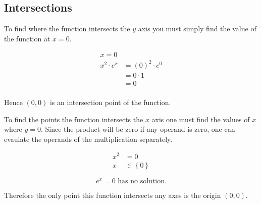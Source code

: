 \subsection{Intersections}

To find where the function intersects the $y$ axis you must simply
find the value of the function at \(x = 0\).

\[
    \begin{aligned}
        x = 0 & \\
        x^2\cdot e^x & = (0)^2 \cdot e^0 \\
        & = 0\cdot 1 \\
        & = 0 \\
    \end{aligned}
\]

Hence \((0,0)\) is an intersection point of the function.

To find the points the function intersects the $x$ axis one must find the values
of $x$ where $y = 0$. Since the product will be zero if any operand is zero,
one can evaulate the operands of the multiplication separately.

\[
    \begin{aligned}
        x^2 & = 0 \\
        x & \in \left\{0\right\}
    \end{aligned}
\]

\[
    e^x = 0 \text{ has no solution.}
\]

Therefore the only point this function intersects any axes is the origin \((0,0)\).